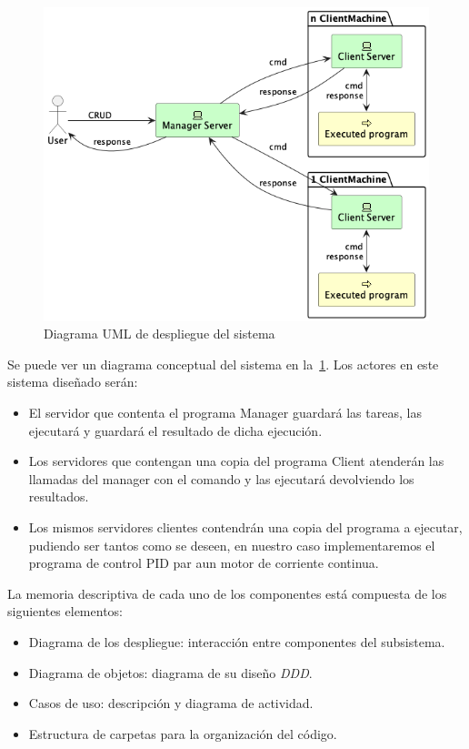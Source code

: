 
\begin{figure}[H]
    \centering
    \includegraphics[height=0.4\textheight]{./part/Proyecto_ejecutivo/memoria_descriptiva/descripcionDelProyecto/manager/uml/systemConcept}
    \caption{Diagrama UML de despliegue del sistema}\label{fig:Diagrama UML de despliegue del sistema}
\end{figure}

Se puede ver un diagrama conceptual del sistema en la~\cref{fig:Diagrama UML de despliegue del sistema}.
Los actores en este sistema diseñado serán:
\begin{itemize}
    \item El servidor que contenta el programa \gls{Manager} guardará las tareas, las ejecutará y guardará el resultado de dicha ejecución.
    \item Los servidores que contengan una copia del programa \gls{Client} atenderán las llamadas del manager con el comando y las ejecutará devolviendo los resultados.
    \item Los mismos servidores clientes contendrán una copia del programa a ejecutar, pudiendo ser tantos como se deseen, en nuestro caso implementaremos el programa de control PID par aun motor de corriente continua.
\end{itemize}

La memoria descriptiva de cada uno de los componentes está compuesta de los siguientes elementos:

\begin{itemize}
    \item Diagrama de los despliegue: interacción entre componentes del subsistema.
    \item Diagrama de objetos: diagrama de su diseño \textit{DDD}.
    \item Casos de uso: descripción y diagrama de actividad.
    \item Estructura de carpetas para la organización del código.
\end{itemize}

